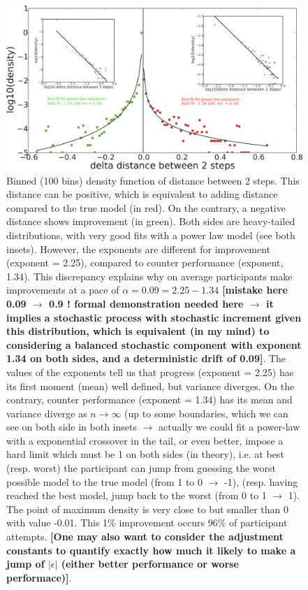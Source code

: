 \documentclass{article}
\begin{document}
\begin{figure}[h!]
\begin{center}
\includegraphics[width=0.7\columnwidth]{figures/pdfPerformance/pdfPerformance}
\caption{Binned (100 bins) density function of distance between 2 steps. This distance can be positive, which is equivalent to adding distance compared to the true model (in red). On the contrary, a negative distance shows improvement (in green). Both sides are heavy-tailed distributions, with very good fits with a power law model (see both insets). However, the exponents are different for improvement (exponent = 2.25), compared to counter performance (exponent, 1.34). This discrepancy explains why on average participants make improvements at a pace of $\alpha = 0.09 = 2.25 - 1.34$ {\bf [mistake here 0.09 $\rightarrow$ 0.9 ! formal demonstration needed here $\rightarrow$ it implies a stochastic process with stochastic increment given this distribution, which is equivalent (in my mind) to considering a balanced stochastic component with exponent 1.34 on both sides, and a deterministic drift of 0.09]}. The values of the exponents tell us that progress (exponent = 2.25) has its first moment (mean) well defined, but variance diverges. On the contrary, counter performance (exponent = 1.34) has its mean and variance diverge as $n \rightarrow \infty$ (up to some boundaries, which we can see on both side in both insets $\rightarrow$ actually we could fit a power-law with a exponential crossover in the tail, or even better, impose a hard limit which must be 1 on both sides (in theory), i.e. at best (resp. worst) the participant can jump from guessing the worst possible model to the true model (from 1 to 0 $\rightarrow$ -1), (resp. having reached the best model, jump back to the worst (from 0 to 1 $\rightarrow$ 1). The point of maximum density is very close to but smaller than 0 with value -0.01. This 1\% improvement occurs 96\% of participant attempts. {\bf [One may also want to consider the adjustment constants to quantify exactly how much it likely to make a jump of $|\epsilon|$ (either better performance or worse performace)]}.%
}
\end{center}
\end{figure}
\end{document}
